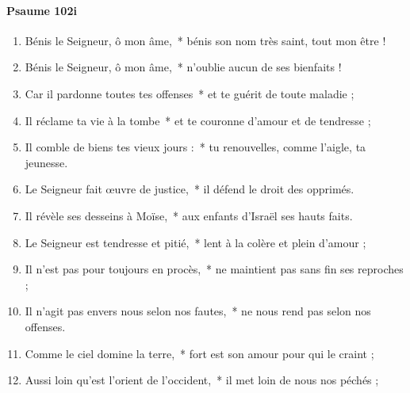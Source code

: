 \documentclass[twoside]{article}
\begin{document}
\begin{paracol}[1]{2}
\paragraph{Psaume 102i}
\begin{enumerate}[wide, itemsep=0mm, labelwidth=!, labelindent=0pt, label=\color{gregoriocolor}\theenumi]
\item Bénis le Seigneur, ô mon âme,~* bénis son nom très saint, tout mon être !
\item Bénis le Seigneur, ô mon âme,~* n'oublie aucun de ses bienfaits !
\item Car il pardonne toutes tes offenses~* et te guérit de toute maladie ;
\item Il réclame ta vie à la tombe~* et te couronne d'amour et de tendresse ;
\item Il comble de biens tes vieux jours :~* tu renouvelles, comme l'aigle, ta jeunesse.
\item Le Seigneur fait œuvre de justice,~* il défend le droit des opprimés.
\item Il révèle ses desseins à Moïse,~* aux enfants d'Israël ses hauts faits.
\item Le Seigneur est tendresse et pitié,~* lent à la colère et plein d'amour ;
\item Il n'est pas pour toujours en procès,~* ne maintient pas sans fin ses reproches ;
\item Il n'agit pas envers nous selon nos fautes,~* ne nous rend pas selon nos offenses.
\item Comme le ciel domine la terre,~* fort est son amour pour qui le craint ;
\item Aussi loin qu'est l'orient de l'occident,~* il met loin de nous nos péchés ;
\end{enumerate}
\switchcolumn*


\end{paracol}
\end{document}

